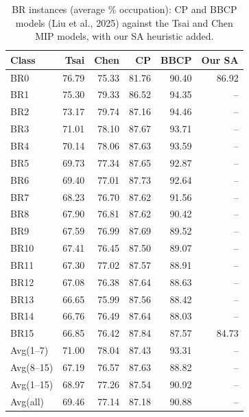\begin{table}[htbp]
  \centering
  \caption{BR instances (average \% occupation): CP and BBCP models
    (Liu et al., 2025) against the Tsai and Chen MIP models, with our
    SA heuristic added.}
  \label{tab:br-occupation}
  \begin{tabular}{lrrrrr}
    \toprule
    Class      & Tsai  & Chen  & CP    & BBCP  & Our SA \\
    \midrule
    BR0        & 76.79 & 75.33 & 81.76 & 90.40 & 86.92 \\
    BR1        & 75.30 & 79.33 & 86.52 & 94.35 & --    \\
    BR2        & 73.17 & 79.74 & 87.16 & 94.46 & --    \\
    BR3        & 71.01 & 78.10 & 87.67 & 93.71 & --    \\
    BR4        & 70.14 & 78.06 & 87.63 & 93.59 & --    \\
    BR5        & 69.73 & 77.34 & 87.65 & 92.87 & --    \\
    BR6        & 69.40 & 77.01 & 87.73 & 92.64 & --    \\
    BR7        & 68.23 & 76.70 & 87.62 & 91.56 & --    \\
    BR8        & 67.90 & 76.81 & 87.62 & 90.42 & --    \\
    BR9        & 67.59 & 76.99 & 87.69 & 89.52 & --    \\
    BR10       & 67.41 & 76.45 & 87.50 & 89.07 & --    \\
    BR11       & 67.30 & 77.02 & 87.57 & 88.91 & --    \\
    BR12       & 67.08 & 76.38 & 87.64 & 88.63 & --    \\
    BR13       & 66.65 & 75.99 & 87.56 & 88.42 & --    \\
    BR14       & 66.76 & 76.49 & 87.64 & 88.03 & --    \\
    BR15       & 66.85 & 76.42 & 87.84 & 87.57 & 84.73 \\
    \midrule
    Avg(1--7)  & 71.00 & 78.04 & 87.43 & 93.31 & --    \\
    Avg(8--15) & 67.19 & 76.57 & 87.63 & 88.82 & --    \\
    Avg(1--15) & 68.97 & 77.26 & 87.54 & 90.92 & --    \\
    Avg(all)   & 69.46 & 77.14 & 87.18 & 90.88 & --    \\
    \bottomrule
  \end{tabular}
\end{table}

